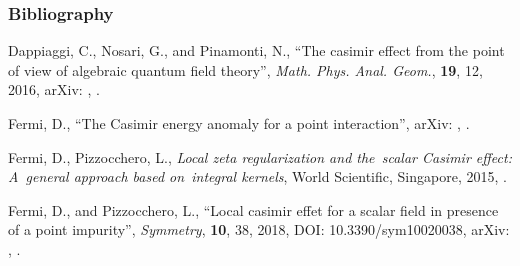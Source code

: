 \documentclass[10pt,t]{beamer}
\begin{document}
\begin{frame}
  \frametitle{Bibliography}


  \begin{thebibliography}{99}

    Dappiaggi, C., Nosari, G., and Pinamonti, N., ``The casimir effect
    from the point of view of algebraic quantum field theory'',
    \emph{Math. Phys. Anal. Geom.}, \textbf{19}, 12, 2016, arXiv:
    ,
    \cite{DappiaggiNosariPianamontiCasimirEffectAlgebraic2016}.

   Fermi,
    D., ``The Casimir energy anomaly for a point interaction'', arXiv:
    ,
    \cite{FermiCasimirEnergyAnomalyForPointInteraction2019}.

    Fermi, D., Pizzocchero, L., \emph{Local zeta regularization and
      the~scalar Casimir effect: A~general approach based on~integral
      kernels}, World Scientific, Singapore, 2015,
    \cite{FermiPizzaccheroLocalZetaRegularizationAndScalarCasimirEffect2015}.

   Fermi, D.,
    and Pizzocchero, L., ``Local casimir effet for a scalar field in
    presence of a point impurity'', \emph{Symmetry}, \textbf{10}, 38,
    2018, DOI: 10.3390/sym10020038, arXiv:
    , \cite{FermiPizzoccheroLocalCasimirPointImpurity2018}.

  \end{thebibliography}

\end{frame}
\end{document}
